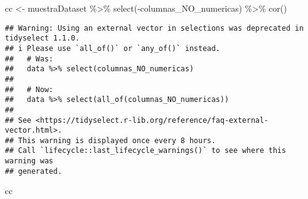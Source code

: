 \documentclass[
]{article}
\newenvironment{Shaded}{\begin{snugshade}}{\end{snugshade}}
\newcommand{\FunctionTok}[1]{\textcolor[rgb]{0.00,0.00,0.00}{#1}}
\newcommand{\NormalTok}[1]{#1}
\newcommand{\OtherTok}[1]{\textcolor[rgb]{0.56,0.35,0.01}{#1}}
\newcommand{\SpecialCharTok}[1]{\textcolor[rgb]{0.00,0.00,0.00}{#1}}
\begin{document}
\begin{Shaded}
\begin{Highlighting}[]
\NormalTok{cc }\OtherTok{\textless{}{-}}\NormalTok{ muestraDataset }\SpecialCharTok{\%\textgreater{}\%} \FunctionTok{select}\NormalTok{(}\SpecialCharTok{{-}}\NormalTok{columnas\_NO\_numericas) }\SpecialCharTok{\%\textgreater{}\%} \FunctionTok{cor}\NormalTok{()}
\end{Highlighting}
\end{Shaded}

\begin{verbatim}
## Warning: Using an external vector in selections was deprecated in tidyselect 1.1.0.
## i Please use `all_of()` or `any_of()` instead.
##   # Was:
##   data %>% select(columnas_NO_numericas)
## 
##   # Now:
##   data %>% select(all_of(columnas_NO_numericas))
## 
## See <https://tidyselect.r-lib.org/reference/faq-external-vector.html>.
## This warning is displayed once every 8 hours.
## Call `lifecycle::last_lifecycle_warnings()` to see where this warning was
## generated.
\end{verbatim}

\begin{Shaded}
\begin{Highlighting}[]
\NormalTok{cc}
\end{Highlighting}
\end{Shaded}
\end{document}
